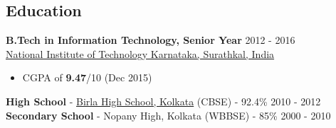 \documentclass[margin, centered]{res}
\begin{document}
\begin{resume}

\section{Education}
\textbf{B.Tech in Information Technology, Senior Year} \hfill 2012 - 2016 \\
\href{http://nitk.ac.in/}{National Institute of Technology Karnataka, Surathkal, India}
\begin{itemize}
 \item CGPA of \textbf{9.47}/10 (Dec 2015)
\end{itemize}
\textbf{High School} - \href{http://www.birlahighschool.com/}{Birla High School, Kolkata} (CBSE) - 92.4\% \hfill 2010 - 2012 \\
\textbf{Secondary School} - Nopany High, Kolkata (WBBSE) - 85\% \hfill 2000 - 2010
 

\end{resume}
\end{document}
